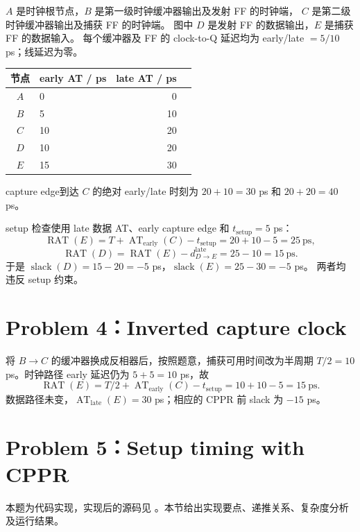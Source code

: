 \documentclass[UTF8,a4paper,11pt,fontset=fandol]{ctexart}
\newcommand{\code}[1]{\texttt{\detokenize{#1}}}
\newcommand{\AT}{\operatorname{AT}}
\newcommand{\RAT}{\operatorname{RAT}}
\newcommand{\slack}{\operatorname{slack}}
\begin{document}
$A$ 是时钟根节点，$B$ 是第一级时钟缓冲器输出及发射 FF 的时钟端，
$C$ 是第二级时钟缓冲器输出及捕获 FF 的时钟端。
图中 $D$ 是发射 FF 的数据输出，$E$ 是捕获 FF 的数据输入。
每个缓冲器及 FF 的 clock-to-Q 延迟均为 early/late $=5/10$ ps；线延迟为零。
\begin{center}
\begin{tabular}{clrr}
\toprule
节点 & early AT / ps & late AT / ps\\
\midrule
$A$ & 0 & 0\\
$B$ & 5 & 10\\
$C$ & 10 & 20\\
$D$ & 10 & 20\\
$E$ & 15 & 30\\
\bottomrule
\end{tabular}
\end{center}
capture edge到达 $C$ 的绝对 early/late 时刻为 $20+10=30$ ps 和 $20+20=40$ ps。

setup 检查使用 late 数据 AT、early capture edge 和 $t_{\mathrm{setup}}=5$ ps：
\[
\RAT(E)=T+\AT_{\mathrm{early}}(C)-t_{\mathrm{setup}}=20+10-5=25\ \mathrm{ps},
\]
\[
\RAT(D)=\RAT(E)-d^{\mathrm{late}}_{D\to E}=25-10=15\ \mathrm{ps}.
\]
于是 $\slack(D)=15-20=-5$ ps，$\slack(E)=25-30=-5$ ps。
两者均违反 setup 约束。

\section{Problem 4：Inverted capture clock}
将 $B\to C$ 的缓冲器换成反相器后，按照题意，捕获可用时间改为半周期
$T/2=10$ ps。时钟路径 early 延迟仍为 $5+5=10$ ps，故
\[
\RAT(E)=T/2+\AT_{\mathrm{early}}(C)-t_{\mathrm{setup}}=10+10-5=15\ \mathrm{ps}.
\]
数据路径未变，$\AT_{\mathrm{late}}(E)=30$ ps；相应的 CPPR 前 slack 为 $-15$ ps。

\clearpage
\section{Problem 5：Setup timing with CPPR}
本题为代码实现，实现后的源码见 \code{sta.py}。本节给出实现要点、递推关系、复杂度分析及运行结果。
\end{document}
